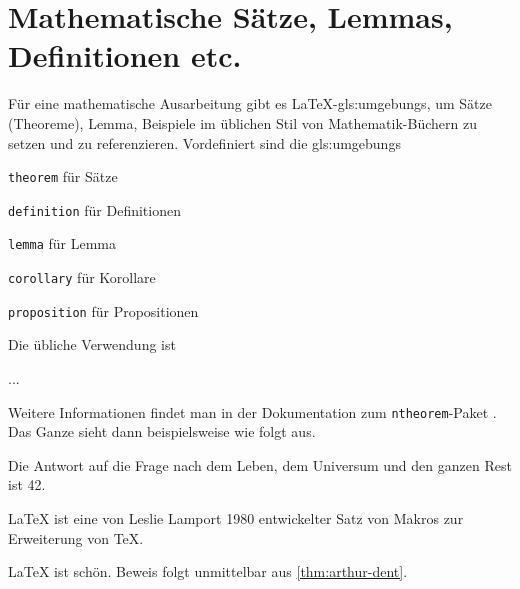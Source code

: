 \section{Mathematische Sätze, Lemmas, Definitionen etc.}%
\label{sec:Theoreme}
%
Für eine mathematische Ausarbeitung gibt es LaTeX-\glspl{gls:umgebung}, um
Sätze (Theoreme), Lemma,
Beispiele \etc im üblichen Stil von
Mathematik-Büchern zu setzen und zu referenzieren. Vordefiniert sind die
\glspl{gls:umgebung}
\begin{itemize*}
  \item \texttt{theorem} für Sätze
  \item \texttt{definition} für Definitionen
  \item \texttt{lemma} für Lemma
  \item \texttt{corollary} für Korollare
  \item \texttt{proposition} für Propositionen
\end{itemize*}
Die übliche Verwendung ist
\begin{latex}[caption={Beispiel für Theorem-Umgebungen},label={lst:ntheorem}]
\begin{theorem}\label{thm:my-theorem}
...
\end{theorem}
\end{latex}
Weitere Informationen findet man in der Dokumentation zum \texttt{ntheorem}-Paket
\parencite{May2011}. Das Ganze sieht dann beispielsweise wie folgt aus.

\begin{theorem}
\label{thm:arthur-dent} Die Antwort auf die Frage nach dem Leben, dem Universum und den ganzen Rest ist 42.
\end{theorem}

\begin{definition}
\LaTeX{} ist eine von Leslie Lamport 1980 entwickelter Satz von Makros zur Erweiterung von \TeX.
\end{definition}

\begin{proposition}
LaTeX ist schön. Beweis folgt unmittelbar aus \cref{thm:arthur-dent}.
\end{proposition}
